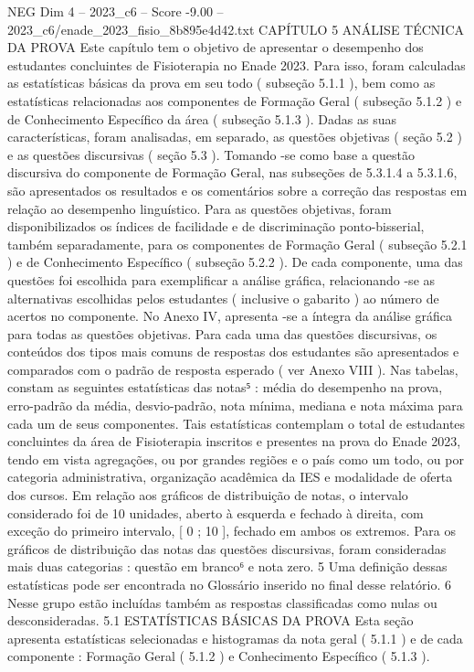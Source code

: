 \begin{textsample}{NEG Dim 4 – 2023\_c6 – Score -9.00 – 2023\_c6/enade\_2023\_fisio\_8b895e4d42.txt}  \label{ex:f4_neg_014}
CAPÍTULO 5 ANÁLISE TÉCNICA DA PROVA Este capítulo tem o objetivo de apresentar o desempenho dos estudantes concluintes de Fisioterapia no Enade 2023.
Para isso, foram calculadas as estatísticas básicas da prova em seu todo ( subseção 5.1.1 ), bem como as estatísticas relacionadas aos componentes de Formação Geral ( subseção 5.1.2 ) e de Conhecimento Específico da área ( subseção 5.1.3 ).
Dadas as suas características, foram analisadas, em separado, as questões objetivas ( seção 5.2 ) e as questões discursivas ( seção 5.3 ).
Tomando -se como base a questão discursiva do componente de Formação Geral, nas subseções de 5.3.1.4 a 5.3.1.6, são apresentados os resultados e os comentários sobre a correção das respostas em relação ao desempenho linguístico.
Para as questões objetivas, foram disponibilizados os índices de facilidade e de discriminação ponto-bisserial, também separadamente, para os componentes de Formação Geral ( subseção 5.2.1 ) e de Conhecimento Específico ( subseção 5.2.2 ).
De cada componente, uma das questões foi escolhida para exemplificar a análise gráfica, relacionando -se as alternativas escolhidas pelos estudantes ( inclusive o gabarito ) ao número de acertos no componente.
No Anexo IV, apresenta -se a íntegra da análise gráfica para todas as questões objetivas.
Para cada uma das questões discursivas, os conteúdos dos tipos mais comuns de respostas dos estudantes são apresentados e comparados com o padrão de resposta esperado ( ver Anexo VIII ).
Nas tabelas, constam as seguintes estatísticas das notas⁵ : média do desempenho na prova, erro-padrão da média, desvio-padrão, nota mínima, mediana e nota máxima para cada um de seus componentes.
Tais estatísticas contemplam o total de estudantes concluintes da área de Fisioterapia inscritos e presentes na prova do Enade 2023, tendo em vista agregações, ou por grandes regiões e o país como um todo, ou por categoria administrativa, organização acadêmica da IES e modalidade de oferta dos cursos.
Em relação aos gráficos de distribuição de notas, o intervalo considerado foi de 10 unidades, aberto à esquerda e fechado à direita, com exceção do primeiro intervalo, [ 0 ; 10 ], fechado em ambos os extremos.
Para os gráficos de distribuição das notas das questões discursivas, foram consideradas mais duas categorias : questão em branco⁶ e nota zero. 5 Uma definição dessas estatísticas pode ser encontrada no Glossário inserido no final desse relatório. 6 Nesse grupo estão incluídas também as respostas classificadas como nulas ou desconsideradas. 5.1 ESTATÍSTICAS BÁSICAS DA PROVA Esta seção apresenta estatísticas selecionadas e histogramas da nota geral ( 5.1.1 ) e de cada componente : Formação Geral ( 5.1.2 ) e Conhecimento Específico ( 5.1.3 ).

\end{textsample}
